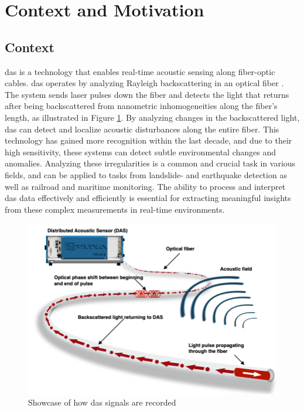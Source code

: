 \section{Context and Motivation}

\subsection{Context} 

\acrfull{das} is a technology that enables real-time acoustic sensing along fiber-optic cables. \acrshort{das} operates by analyzing Rayleigh backscattering in an optical fiber \cite{shang2016optical}. The system sends laser pulses down the fiber and detects the light that returns after being backscattered from nanometric inhomogeneities along the fiber's length, as illustrated in Figure \ref{fig:das-fig}. By analyzing changes in the backscattered light, \acrshort{das} can detect and localize acoustic disturbances along the entire fiber. This technology has gained more recognition within the last decade, and due to their high sensitivity, these systems can detect subtle environmental changes and anomalies. Analyzing these irregularities is a common and crucial task in various fields, and can be applied to tasks from landslide- and earthquake detection as well as railroad and maritime monitoring. The ability to process and interpret \acrshort{das} data effectively and efficiently is essential for extracting meaningful insights from these complex measurements in real-time environments. \\

\begin{figure}[htbp]
    \centering
    \includegraphics[width=0.7\linewidth]{figures/das.png}
    \caption{Showcase of how \acrshort{das} signals are recorded\footnotemark}
    \label{fig:das-fig}
\end{figure}


